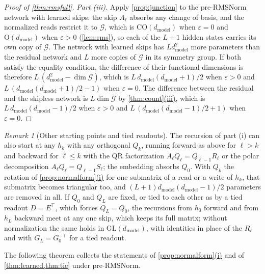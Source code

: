 \documentclass[10pt]{article}
\theoremstyle{definition}
\theoremstyle{remark}
\newtheorem{remark}[theorem]{Remark}
\newcommand{\dm}{d_{\mathrm{model}}}
\newcommand{\GL}{\mathrm{GL}}
\newcommand{\Ort}{\mathrm{O}}
\newcommand{\CO}{\mathrm{CO}}
\newcommand{\G}{\mathcal{G}}
\DeclareRobustCommand{\cpref}[2]{\hyperref[#1:#2]{\cref*{#1}(#2)}}
\begin{document}
\begin{proof}[Proof of \cref{thm:rmsfull}]
\emph{Part (iii).} Apply \cref{prop:junction} to the pre-RMSNorm network with learned skips: the skip $A_\ell$ absorbs any change of basis, and the normalized reads restrict it to $\G$, which is $\CO(\dm)$ when $\varepsilon = 0$ and $\Ort(\dm)$ when $\varepsilon > 0$ (\cref{lem:rms}), so each of the $L+1$ hidden states carries its own copy of $\G$. The network with learned skips has $L\dm^2$ more parameters than the residual network and $L$ more copies of $\G$ in its symmetry group. If both satisfy the equality condition, the difference of their functional dimensions is therefore $L\,(\dm^2 - \dim\G)$, which is $L\,\dm(\dm+1)/2$ when $\varepsilon > 0$ and $L\,(\dm(\dm+1)/2 - 1)$ when $\varepsilon = 0$. The difference between the residual and the skipless network is $L\dim\G$ by \cpref{thm:count}{iii}, which is $L\,\dm(\dm-1)/2$ when $\varepsilon > 0$ and $L\,(\dm(\dm-1)/2 + 1)$ when $\varepsilon = 0$.
\end{proof}

\begin{remark}[Other starting points and tied readouts]\label{rem:rmsstart}
The recursion of part (i) can also start at any $h_k$ with any orthogonal $Q_k$, running forward as above for $\ell > k$ and backward for $\ell \le k$ with the QR factorization $A_\ell Q_\ell = Q_{\ell-1}R_\ell$ or the polar decomposition $A_\ell Q_\ell = Q_{\ell-1}S_\ell$; the embedding absorbs $Q_0$. With $Q_k$ the rotation of \cpref{prop:normalform}{i} for one submatrix of a read or a write of $h_k$, that submatrix becomes triangular too, and $(L+1)\dm(\dm-1)/2$ parameters are removed in all. If $Q_0$ and $Q_L$ are fixed, or tied to each other as by a tied readout $D = E^\top$, which forces $Q_L = Q_0$, the recursions from $h_0$ forward and from $h_L$ backward meet at any one skip, which keeps its full matrix; without normalization the same holds in $\GL(\dm)$, with identities in place of the $R_\ell$ and with $G_L = G_0^{-\top}$ for a tied readout.
\end{remark}

The following theorem collects the statements of \cpref{prop:normalform}{i} and of \cref{thm:learned,thm:tie} under pre-RMSNorm.
\end{document}
